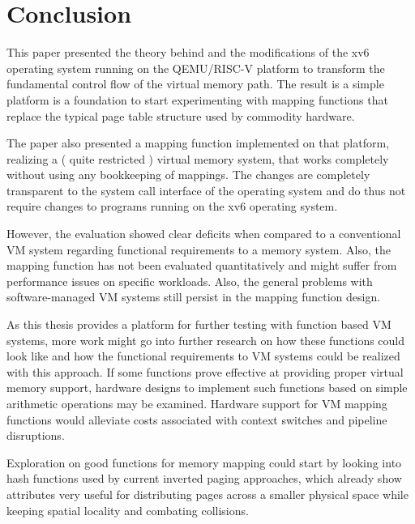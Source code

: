 \chapter{Conclusion}

\label{chap:conclusion}

\cite{choudhuri2005software} %


This paper presented the theory behind and the modifications of the xv6 operating system running on the QEMU/RISC-V platform to transform the fundamental control flow of the virtual memory path. The result is a simple platform is a foundation to start experimenting with mapping functions that replace the typical page table structure used by commodity hardware.

The paper also presented a mapping function implemented on that platform, realizing a ( quite restricted ) virtual memory system, that works completely without using any bookkeeping of mappings. The changes are completely transparent to the system call interface of the operating system and do thus not require changes to programs running on the xv6 operating system.

However, the evaluation showed clear deficits when compared to a conventional VM system regarding functional requirements to a memory system. Also, the mapping function has not been evaluated quantitatively and might suffer from performance issues on specific workloads. Also, the general problems with software-managed VM systems still persist in the mapping function design.

As this thesis provides a platform for further testing with function based VM systems, more work might go into further research on how these functions could look like and how the functional requirements to VM systems could be realized with this approach. If some functions prove effective at providing proper virtual memory support, hardware designs to implement such functions based on simple arithmetic operations may be examined. Hardware support for VM mapping functions would alleviate costs associated with context switches and pipeline disruptions.

Exploration on good functions for memory mapping could start by looking into hash functions used by current inverted paging approaches, which already show attributes very useful for distributing pages across a smaller physical space while keeping spatial locality and combating collisions.